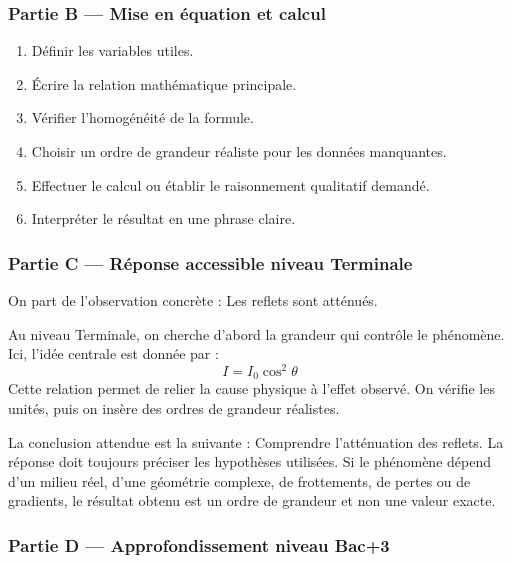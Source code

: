 \documentclass[11pt,a4paper]{article}
\begin{document}
\subsubsection*{Partie B — Mise en équation et calcul}

\begin{enumerate}
  \item Définir les variables utiles.
  \item Écrire la relation mathématique principale.
  \item Vérifier l'homogénéité de la formule.
  \item Choisir un ordre de grandeur réaliste pour les données manquantes.
  \item Effectuer le calcul ou établir le raisonnement qualitatif demandé.
  \item Interpréter le résultat en une phrase claire.
\end{enumerate}

\subsubsection*{Partie C — Réponse accessible niveau Terminale}

\begin{corrigebox}
On part de l'observation concrète : Les reflets sont atténués.

Au niveau Terminale, on cherche d'abord la grandeur qui contrôle le phénomène. Ici, l'idée centrale est donnée par :
\[
I=I_0\cos^2\theta
\]
Cette relation permet de relier la cause physique à l'effet observé. On vérifie les unités, puis on insère des ordres de grandeur réalistes.

La conclusion attendue est la suivante : Comprendre l'atténuation des reflets. La réponse doit toujours préciser les hypothèses utilisées. Si le phénomène dépend d'un milieu réel, d'une géométrie complexe, de frottements, de pertes ou de gradients, le résultat obtenu est un ordre de grandeur et non une valeur exacte.
\end{corrigebox}

\subsubsection*{Partie D — Approfondissement niveau Bac+3}
\end{document}
